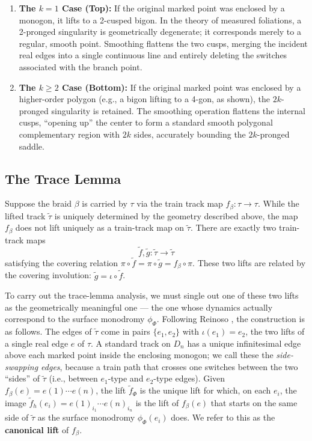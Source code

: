 \begin{enumerate}
    \item \textbf{The $k=1$ Case (Top):} If the original marked point was enclosed by a monogon, it lifts to a 2-cusped bigon. In the theory of measured foliations, a 2-pronged singularity is geometrically degenerate; it corresponds merely to a regular, smooth point. Smoothing flattens the two cusps, merging the incident real edges into a single continuous line and entirely deleting the switches associated with the branch point.
    \item \textbf{The $k \ge 2$ Case (Bottom):} If the original marked point was enclosed by a higher-order polygon (e.g., a bigon lifting to a 4-gon, as shown), the $2k$-pronged singularity is retained. The smoothing operation flattens the internal cusps, ``opening up'' the center to form a standard smooth polygonal complementary region with $2k$ sides, accurately bounding the $2k$-pronged saddle.
\end{enumerate}

\subsection{The Trace Lemma}
Suppose the braid $\beta$ is carried by $\tau$ via the train track map $f_\beta: \tau \to \tau$. While the lifted track $\tilde{\tau}$ is uniquely determined by the geometry described above, the map $f_\beta$ does not lift uniquely as a train-track map on $\tilde\tau$. There are exactly two train-track maps
\[
\tilde{f}, \tilde{g} \colon \tilde{\tau} \to \tilde{\tau}
\]
satisfying the covering relation $\pi \circ \tilde{f} = \pi \circ \tilde{g} = f_\beta \circ \pi$. These two lifts are related by the covering involution: $\tilde{g} = \iota \circ \tilde{f}$.

To carry out the trace-lemma analysis, we must single out one of these two lifts as the geometrically meaningful one --- the one whose dynamics actually correspond to the surface monodromy $\phi_\Phi$. Following Reinoso \cite[Section 2.3.2]{reinoso2024pseudo}, the construction is as follows. The edges of $\tilde\tau$ come in pairs $\{e_1, e_2\}$ with $\iota(e_1) = e_2$, the two lifts of a single real edge $e$ of $\tau$. A standard track on $D_n$ has a unique infinitesimal edge above each marked point inside the enclosing monogon; we call these the \emph{side-swapping edges}, because a train path that crosses one switches between the two ``sides'' of $\tilde\tau$ (i.e., between $e_1$-type and $e_2$-type edges). Given $f_\beta(e) = e(1) \cdots e(n)$, the lift $\tilde{f}_\Phi$ is the unique lift for which, on each $e_i$, the image $\tilde{f}_h(e_i) = e(1)_{i_1} \cdots e(n)_{i_n}$ is the lift of $f_\beta(e)$ that starts on the same side of $\tilde\tau$ as the surface monodromy $\phi_\Phi(e_i)$ does. We refer to this as the \textbf{canonical lift} of $f_\beta$.

